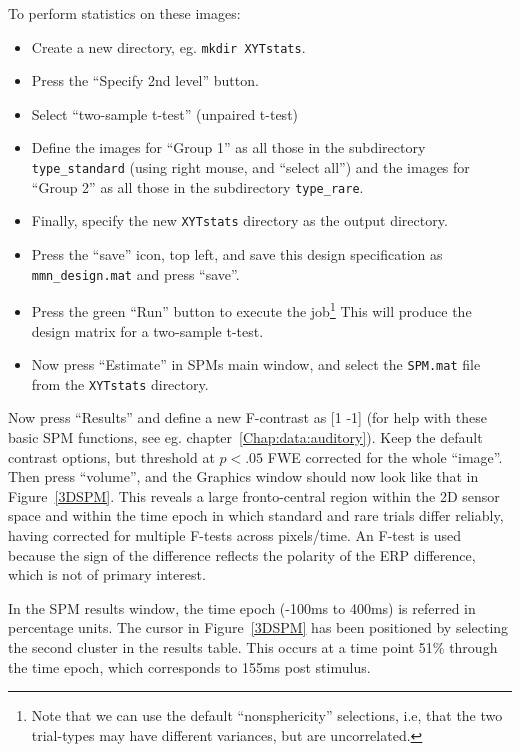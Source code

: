 To perform statistics on these images:
\begin{itemize}
\item{Create a new directory, eg. \texttt{mkdir XYTstats}.}
\item{Press the ``Specify 2nd level'' button.}
\item{Select ``two-sample t-test'' (unpaired t-test)}
\item{Define the images for ``Group 1'' as all those in the subdirectory \texttt{type\_standard} (using right mouse, and ``select all'') and the images for ``Group 2'' as all those in the subdirectory \texttt{type\_rare}.}
\item{Finally, specify the new \texttt{XYTstats} directory as the output directory.}
\item{Press the ``save'' icon, top left, and save this design specification as \texttt{mmn\_design.mat} and press ``save''.}
\item{Press the green ``Run'' button to execute the job\footnote{Note that we can use the default ``nonsphericity'' selections, i.e, that the two trial-types may have different variances, but are uncorrelated.} This will produce the design matrix for a two-sample t-test.} 
\item{Now press ``Estimate'' in SPMs main window, and select the \texttt{SPM.mat} file from the \texttt{XYTstats} directory.}
\end{itemize}
Now press ``Results'' and define a new F-contrast as [1 -1] (for help with these basic SPM functions, see eg. chapter~\ref{Chap:data:auditory}). Keep the default contrast options, but threshold at $p<.05$ FWE corrected for the whole ``image''. Then press ``volume'', and the Graphics window should now look like that in Figure~\ref{3DSPM}. This reveals a large fronto-central region within the 2D sensor space and within the time epoch in which standard and rare trials differ reliably, having corrected for multiple F-tests across pixels/time. An F-test is used because the sign of the difference reflects the polarity of the ERP difference, which is not of primary interest.
 
In the SPM results window, the time epoch (-100ms to 400ms) is referred in percentage units. The cursor in Figure~\ref{3DSPM} has been positioned by selecting the second cluster in the results table. This occurs at a time point 51\% through the time epoch, which corresponds to 155ms post stimulus.
 
